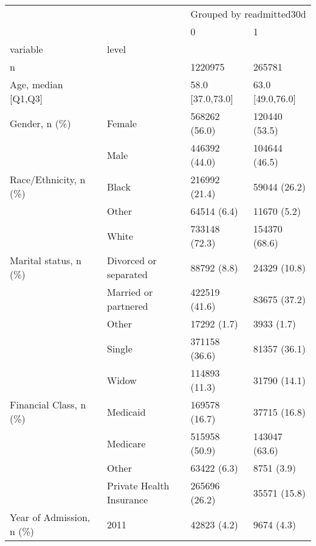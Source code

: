 \begin{tabular}{llll}
\toprule
                                       &   & \multicolumn{2}{l}{Grouped by readmitted30d} \\
                                       &   &                        0 &                 1 \\
variable & level &                          &                   \\
\midrule
n &   &                  1220975 &            265781 \\
Age, median [Q1,Q3] &   &         58.0 [37.0,73.0] &  63.0 [49.0,76.0] \\
Gender, n (\%) & Female &            568262 (56.0) &     120440 (53.5) \\
                                       & Male &            446392 (44.0) &     104644 (46.5) \\
Race/Ethnicity, n (\%) & Black &            216992 (21.4) &      59044 (26.2) \\
                                       & Other &              64514 (6.4) &       11670 (5.2) \\
                                       & White &            733148 (72.3) &     154370 (68.6) \\
Marital status, n (\%) & Divorced or separated &              88792 (8.8) &      24329 (10.8) \\
                                       & Married or partnered &            422519 (41.6) &      83675 (37.2) \\
                                       & Other &              17292 (1.7) &        3933 (1.7) \\
                                       & Single &            371158 (36.6) &      81357 (36.1) \\
                                       & Widow &            114893 (11.3) &      31790 (14.1) \\
Financial Class, n (\%) & Medicaid &            169578 (16.7) &      37715 (16.8) \\
                                       & Medicare &            515958 (50.9) &     143047 (63.6) \\
                                       & Other &              63422 (6.3) &        8751 (3.9) \\
                                       & Private Health Insurance &            265696 (26.2) &      35571 (15.8) \\
Year of Admission, n (\%) & 2011 &              42823 (4.2) &        9674 (4.3) \\

\end{tabular}
